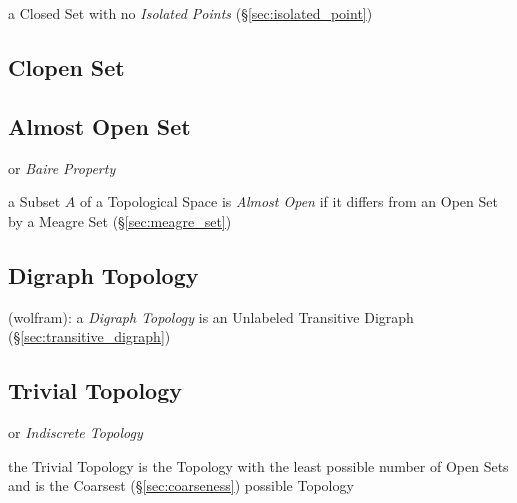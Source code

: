 a Closed Set with no \emph{Isolated Points}
(\S\ref{sec:isolated_point})



\subsection{Clopen Set}\label{sec:clopen_set}

\subsection{Almost Open Set}\label{sec:almost_open}

or \emph{Baire Property}

a Subset $A$ of a Topological Space is \emph{Almost Open} if it differs from an
Open Set by a Meagre Set (\S\ref{sec:meagre_set})



\subsection{Digraph Topology}\label{sec:digraph_topology}

(wolfram): a \emph{Digraph Topology} is an Unlabeled Transitive Digraph
(\S\ref{sec:transitive_digraph})



\subsection{Trivial Topology}\label{sec:trivial_topology}

or \emph{Indiscrete Topology}

the Trivial Topology is the Topology with the least possible number of Open
Sets and is the Coarsest (\S\ref{sec:coarseness}) possible Topology



